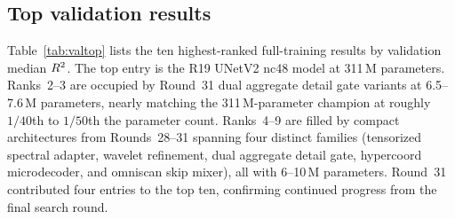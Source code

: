 ﻿\documentclass[preprint,12pt,authoryear]{elsarticle}
\newcommand{\rTwo}{R\textsuperscript{2}}
\begin{document}
\subsection{Top validation results}
\label{sec:valtop}

Table~\ref{tab:valtop} lists the ten highest-ranked full-training results by validation median $\rTwo{}$.
The top entry is the R19 UNetV2 nc48 model at 311\,M parameters.
Ranks~2--3 are occupied by Round~31 dual aggregate detail gate variants at 6.5--7.6\,M parameters, nearly matching the 311\,M-parameter champion at roughly $1/40$th to $1/50$th the parameter count.
Ranks~4--9 are filled by compact architectures from Rounds~28--31 spanning four distinct families (tensorized spectral adapter, wavelet refinement, dual aggregate detail gate, hypercoord microdecoder, and omniscan skip mixer), all with 6--10\,M parameters.
Round~31 contributed four entries to the top ten, confirming continued progress from the final search round.
\end{document}
